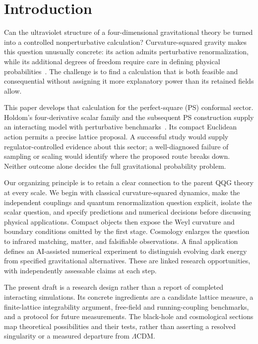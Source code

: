 \section{Introduction}
\label{sec:introduction}

Can the ultraviolet structure of a four-dimensional gravitational theory be turned into a controlled nonperturbative calculation?  Curvature-squared gravity makes this question unusually concrete: its action admits perturbative renormalization, while its additional degrees of freedom require care in defining physical probabilities~\cite{Stelle:1977ry,Salvio:2018}.  The challenge is to find a calculation that is both feasible and consequential without assigning it more explanatory power than its retained fields allow.

This paper develops that calculation for the perfect-square (PS) conformal sector.  Holdom's four-derivative scalar family and the subsequent PS construction supply an interacting model with perturbative benchmarks~\cite{Holdom:2023,Holdom:2024,Anderson:2026}.  Its compact Euclidean action permits a precise lattice proposal.  A successful study would supply regulator-controlled evidence about this sector; a well-diagnosed failure of sampling or scaling would identify where the proposed route breaks down.  Neither outcome alone decides the full gravitational probability problem.

Our organizing principle is to retain a clear connection to the parent QQG theory at every scale.  We begin with classical curvature-squared dynamics, make the independent couplings and quantum renormalization question explicit, isolate the scalar question, and specify predictions and numerical decisions before discussing physical applications.  Compact objects then expose the Weyl curvature and boundary conditions omitted by the first stage.  Cosmology enlarges the question to infrared matching, matter, and falsifiable observations.  A final application defines an AI-assisted numerical experiment to distinguish evolving dark energy from specified gravitational alternatives.  These are linked research opportunities, with independently assessable claims at each step.

The present draft is a research design rather than a report of completed interacting simulations.  Its concrete ingredients are a candidate lattice measure, a finite-lattice integrability argument, free-field and running-coupling benchmarks, and a protocol for future measurements.  The black-hole and cosmological sections map theoretical possibilities and their tests, rather than asserting a resolved singularity or a measured departure from $\Lambda$CDM.

